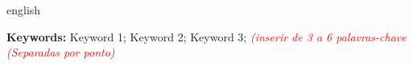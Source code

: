 \setlength{\absparsep}{18pt}
\renewcommand*\resumoatitlename{Abstract}
\begin{resumo}[Abstract]
  \begin{otherlanguage*}{english}
    \lipsum[1-1]

   \vspace{\onelineskip}
 
   \noindent 
   \textbf{Keywords:} Keyword 1; Keyword 2; Keyword 3; \textit{\textcolor{red}{(inserir de 3 a 6 palavras-chave (Separadas por ponto)}}
 \end{otherlanguage*}
\end{resumo}

